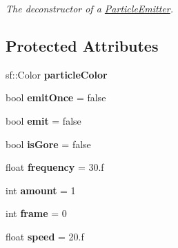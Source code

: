 \begin{DoxyCompactItemize}
\begin{DoxyCompactList}\small\item\em The deconstructor of a \hyperlink{class_particle_emitter}{Particle\+Emitter}. \end{DoxyCompactList}\end{DoxyCompactItemize}
\subsection*{Protected Attributes}
\begin{DoxyCompactItemize}
\item 
\hypertarget{class_particle_emitter_ac5bd01ffba334b3475c723438ebbb0d9}{sf\+::\+Color {\bfseries particle\+Color}}\label{class_particle_emitter_ac5bd01ffba334b3475c723438ebbb0d9}

\item 
\hypertarget{class_particle_emitter_a4bfdf1026500e45025d7d847079449ac}{bool {\bfseries emit\+Once} = false}\label{class_particle_emitter_a4bfdf1026500e45025d7d847079449ac}

\item 
\hypertarget{class_particle_emitter_adad6aa5f4e12833ec208463a471cc72f}{bool {\bfseries emit} = false}\label{class_particle_emitter_adad6aa5f4e12833ec208463a471cc72f}

\item 
\hypertarget{class_particle_emitter_a0bfdd28a5fb6be6d310f4afe19d5bb69}{bool {\bfseries is\+Gore} = false}\label{class_particle_emitter_a0bfdd28a5fb6be6d310f4afe19d5bb69}

\item 
\hypertarget{class_particle_emitter_af32de038d2b86f175da7a7cf6d35f94e}{float {\bfseries frequency} = 30.f}\label{class_particle_emitter_af32de038d2b86f175da7a7cf6d35f94e}

\item 
\hypertarget{class_particle_emitter_ab9bbf606442bbc94056fc99739116fae}{int {\bfseries amount} = 1}\label{class_particle_emitter_ab9bbf606442bbc94056fc99739116fae}

\item 
\hypertarget{class_particle_emitter_a09c7892513030cf727dd44dea28f5785}{int {\bfseries frame} = 0}\label{class_particle_emitter_a09c7892513030cf727dd44dea28f5785}

\item 
\hypertarget{class_particle_emitter_a0f6f30a9cfd1b9b6ed033793ed8c5f4e}{float {\bfseries speed} = 20.f}\label{class_particle_emitter_a0f6f30a9cfd1b9b6ed033793ed8c5f4e}


\end{DoxyCompactItemize}
